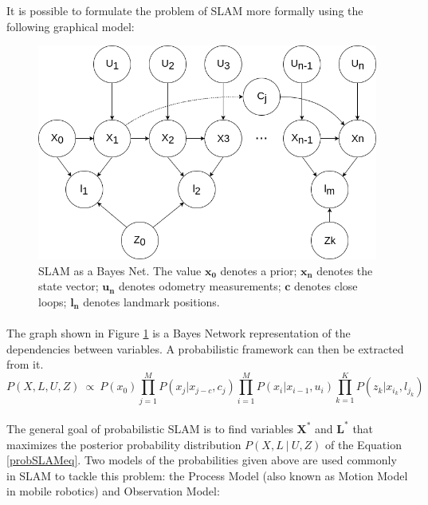 \documentclass[12pt]{article}
\begin{document}
	It is possible to formulate the problem of SLAM more formally using the following graphical model:

\begin{figure}
	\begin{minipage}{0.65\textwidth}
		\centering
		\includegraphics[width=\textwidth]{BayesNetSLAM}
	\end{minipage} \hfill
	\begin{minipage}{0.35\textwidth}
		\centering
		\caption{SLAM as a Bayes Net. The value $\mathbf{x_0}$ denotes a prior; $\mathbf{x_n}$ denotes the state vector; $\mathbf{u_n}$ denotes odometry measurements; $\mathbf{c}$ denotes close loops; $\mathbf{l_n}$ denotes landmark positions.}
		\label{fig:slam1}
	\end{minipage}				
\end{figure}
	
	\paragraph{}
	The graph shown in Figure \ref{fig:slam1} is a Bayes Network representation of the dependencies between variables. A probabilistic framework can then be extracted from it. 
	\begin{equation}
	P(X,L,U,Z)\ \propto \ P(x_0)\prod_{j=1}^{M}P(x_j|x_{j-c},c_j)\prod_{i=1}^{M}P(x_i|x_{i-1}, u_i)\prod_{k=1}^{K}P(z_k|x_{i_k},l_{j_k})
	\label{probSLAMeq}
	\end{equation}
	\paragraph{}
	The general goal of probabilistic SLAM is to find variables $\mathbf{X^*}$ and $\mathbf{L^*}$ that maximizes the posterior probability distribution $P(X,L\ |\ U, Z)$ of the Equation \ref{probSLAMeq}. Two models of the probabilities given above are used commonly in SLAM to tackle this problem: the Process Model (also known as Motion Model in mobile robotics) and Observation Model:
	
\end{document}
